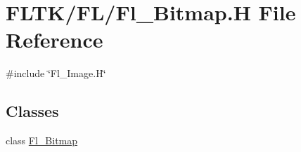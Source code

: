 \hypertarget{_fl___bitmap_8_h}{}\section{F\+L\+T\+K/\+F\+L/\+Fl\+\_\+\+Bitmap.H File Reference}
\label{_fl___bitmap_8_h}
{\ttfamily \#include \char`\"{}Fl\+\_\+\+Image.\+H\char`\"{}}\newline
\subsection*{Classes}
\begin{DoxyCompactItemize}
\item 
class \hyperlink{class_fl___bitmap}{Fl\+\_\+\+Bitmap}
\end{DoxyCompactItemize}
